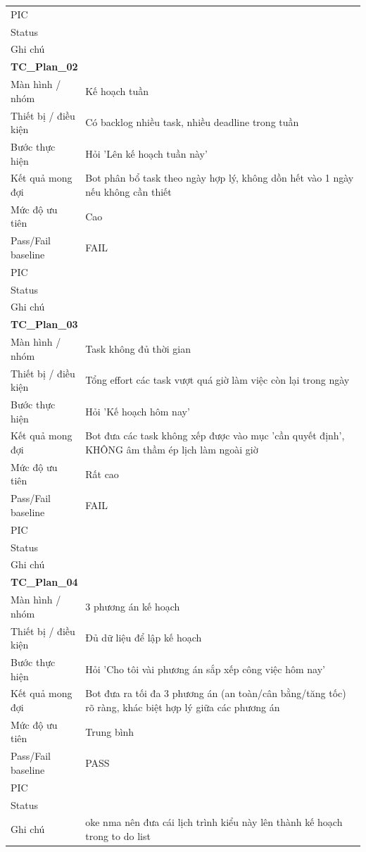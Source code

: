 \documentclass[12pt,a4paper]{article}
\begin{document}
\begin{longtable}{p{3.0cm}p{11.5cm}}
PIC &  \\
Status &  \\
Ghi chú &  \\
\midrule
\multicolumn{2}{l}{\textbf{TC\_Plan\_02}} \\
Màn hình / nhóm & Kế hoạch tuần \\
Thiết bị / điều kiện & Có backlog nhiều task, nhiều deadline trong tuần \\
Bước thực hiện & Hỏi 'Lên kế hoạch tuần này' \\
Kết quả mong đợi & Bot phân bổ task theo ngày hợp lý, không dồn hết vào 1 ngày nếu không cần thiết \\
Mức độ ưu tiên & Cao \\
Pass/Fail baseline & FAIL \\
PIC &  \\
Status &  \\
Ghi chú &  \\
\midrule
\multicolumn{2}{l}{\textbf{TC\_Plan\_03}} \\
Màn hình / nhóm & Task không đủ thời gian \\
Thiết bị / điều kiện & Tổng effort các task vượt quá giờ làm việc còn lại trong ngày \\
Bước thực hiện & Hỏi 'Kế hoạch hôm nay' \\
Kết quả mong đợi & Bot đưa các task không xếp được vào mục 'cần quyết định', KHÔNG âm thầm ép lịch làm ngoài giờ \\
Mức độ ưu tiên & Rất cao \\
Pass/Fail baseline & FAIL \\
PIC &  \\
Status &  \\
Ghi chú &  \\
\midrule
\multicolumn{2}{l}{\textbf{TC\_Plan\_04}} \\
Màn hình / nhóm & 3 phương án kế hoạch \\
Thiết bị / điều kiện & Đủ dữ liệu để lập kế hoạch \\
Bước thực hiện & Hỏi 'Cho tôi vài phương án sắp xếp công việc hôm nay' \\
Kết quả mong đợi & Bot đưa ra tối đa 3 phương án (an toàn/cân bằng/tăng tốc) rõ ràng, khác biệt hợp lý giữa các phương án \\
Mức độ ưu tiên & Trung bình \\
Pass/Fail baseline & PASS \\
PIC &  \\
Status &  \\
Ghi chú & oke nma nên đưa cái lịch trình kiểu này lên thành kế hoạch trong to do list \\

\end{longtable}
\end{document}

